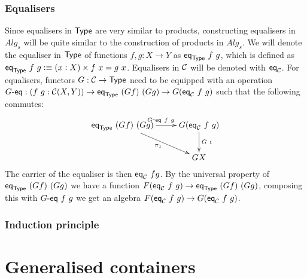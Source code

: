 \documentclass[a4paper,10pt]{report}
\begin{document}
\subsection{Equalisers}

Since equalisers in $\mathsf{Type}$ are very similar to products, constructing
equalisers in $Alg_s$ will be quite similar to the construction of
products in $Alg_s$. We will denote the equaliser in $\mathsf{Type}$ of
functions $f, g : X \to Y$ as $\mathsf{eq}_{\mathsf{Type}}\ f\ g$, which is defined as
$\mathsf{eq}_{\mathsf{Type}}\ f\ g :\equiv (x : X) \times f\ x = g\ x$. Equalisers in
$\mathcal{C}$ will be denoted with $\mathsf{eq}_{\mathcal{C}}$. For equalisers, functors
$G : \mathcal{C} \to \mathsf{Type}$ need to be equipped with an operation
$G\mbox{-}\mathsf{eq} : (f\ g : \mathcal{C}(X,Y)) \to \mathsf{eq}_{\mathsf{Type}}\ (G f)\ (G g) \to G (\mathsf{eq}_{\mathcal{C}}\
f\ g)$ such that the following commutes:
$$
\xymatrix{
\eq_{\Type}\ (G f)\ (G g)
 \ar[r]^{\Geq\ f\ g}
 \ar[rd]_{\pi_1}
&G (\eq_{\C}\ f\ g)
 \ar[d]^{G\ i} \\
&GX
}
$$
The carrier of the equaliser is then $\mathsf{eq}_{\mathcal{C}}\ f g$. By the universal
property of $\mathsf{eq}_{\mathsf{Type}}\ (G f)\ (G g)$ we have a function
$F (\eq_{\C}\ f\ g) \to \eq_{\Type}\ (G f)\ (G g)$, composing this
with $G\mbox{-}\mathsf{eq}\ f\ g$ we get an algebra
$F (\eq_{\C}\ f\ g) \to G (\eq_{\C}\ f\ g)$.

\subsection{Induction principle}


\chapter{Generalised containers}
\label{sec:gencontainers}
\end{document}
